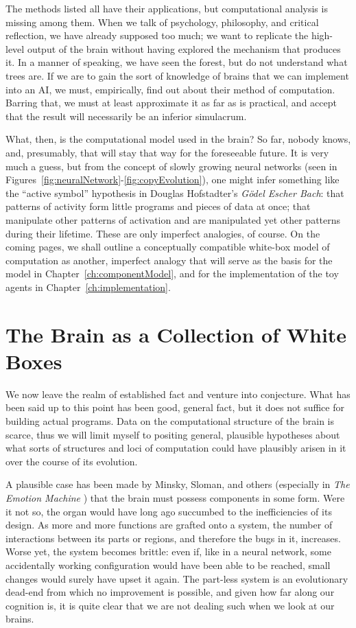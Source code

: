 The methods listed all have their applications, but computational analysis is missing among them. When we talk of psychology, philosophy, and critical reflection, we have already supposed too much; we want to replicate the high-level output of the brain without having explored the mechanism that produces it. In a manner of speaking, we have seen the forest, but do not understand what trees are. If we are to gain the sort of knowledge of brains that we can implement into an AI, we must, empirically, find out about their method of computation. Barring that, we must at least approximate it as far as is practical, and accept that the result will necessarily be an inferior simulacrum.

What, then, is the computational model used in the brain? So far, nobody knows, and, presumably, that will stay that way for the foreseeable future. It is very much a guess, but from the concept of slowly growing neural networks (seen in Figures~\ref{fig:neuralNetwork}-\ref{fig:copyEvolution}), one might infer something like the ``active symbol'' hypothesis in Douglas Hofstadter's {\em G\"{o}del Escher Bach}: that patterns of activity form little programs and pieces of data at once; that manipulate other patterns of activation and are manipulated yet other patterns during their lifetime. These are only imperfect analogies, of course. On the coming pages, we shall outline a conceptually compatible white-box model of computation as another, imperfect analogy that will serve as the basis for the model in Chapter~\ref{ch:componentModel}, and for the implementation of the toy agents in Chapter~\ref{ch:implementation}.

\section{The Brain as a Collection of White Boxes}\label{sec:whiteBoxModel1}

We now leave the realm of established fact and venture into conjecture. What has been said up to this point has been good, general fact, but it does not suffice for building actual programs. Data on the computational structure of the brain is scarce, thus we will limit myself to positing general, plausible hypotheses about what sorts of structures and loci of computation could have plausibly arisen in it over the course of its evolution. 

A plausible case has been made by Minsky, Sloman, and others (especially in {\em The Emotion Machine} \cite{emotionMachine}) that the brain must possess components in some form. Were it not so, the organ would have long ago succumbed to the inefficiencies of its design. As more and more functions are grafted onto a system, the number of interactions between its parts or regions, and therefore the bugs in it, increases. Worse yet, the system becomes brittle: even if, like in a neural network, some accidentally working configuration would have been able to be reached, small changes would surely have upset it again. The part-less system is an evolutionary dead-end from which no improvement is possible, and given how far along our cognition is, it is quite clear that we are not dealing such when we look at our brains.

